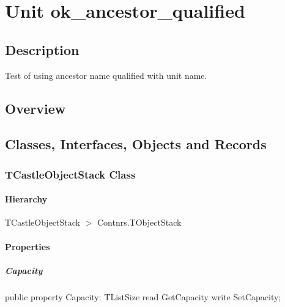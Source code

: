 \documentclass{report}
\begin{document}
\newlength{\tmplength}
\chapter{Unit ok{\_}ancestor{\_}qualified}
\section{Description}
Test of using ancestor name qualified with unit name.
\section{Overview}
\begin{description}
\item[\texttt{\begin{ttfamily}TCastleObjectStack\end{ttfamily} Class}]
\item[\texttt{\begin{ttfamily}TSomethingElse\end{ttfamily} Class}]
\end{description}
\section{Classes, Interfaces, Objects and Records}
\subsection*{TCastleObjectStack Class}
\subsubsection*{\large{\textbf{Hierarchy}}\normalsize\hspace{1ex}\hfill}
TCastleObjectStack {$>$} Contnrs.TObjectStack
\subsubsection*{\large{\textbf{Properties}}\normalsize\hspace{1ex}\hfill}
\paragraph*{Capacity}\hspace*{\fill}

\begin{list}{}{
\setlength{\itemindent}{0cm}
\setlength{\listparindent}{0cm}
\setlength{\leftmargin}{\evensidemargin}
\addtolength{\leftmargin}{\tmplength}
\settowidth{\labelsep}{X}
\addtolength{\leftmargin}{\labelsep}
\setlength{\labelwidth}{\tmplength}
}
\begin{flushleft}
\item[\textbf{Declaration}\hfill]
\begin{ttfamily}
public property Capacity: TListSize read GetCapacity write SetCapacity;\end{ttfamily}


\end{flushleft}
\end{list}
\end{document}
